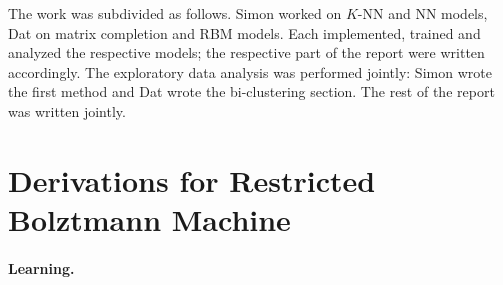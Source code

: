 \documentclass[bj, preprint]{imsart}
\begin{document}
The work was subdivided as follows. Simon worked on $K$-NN and NN models, Dat on matrix completion and RBM models. Each implemented, trained and analyzed the respective models; the respective part of the report were written accordingly. The exploratory data analysis was performed jointly: Simon wrote the first method and Dat wrote the bi-clustering section. The rest of the report was written jointly.

\section{Derivations for Restricted Bolztmann Machine}\label{sec:rbm}

\paragraph{Learning.}\label{par:method.models.rbm.learning}
\end{document}
